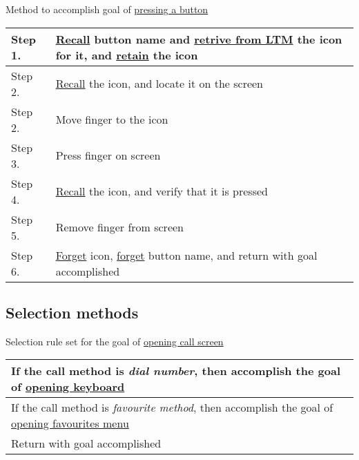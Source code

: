\documentclass{article}
\begin{document}
Method to accomplish goal of \uline{pressing a button}

\begin{tabulary}{\textwidth}{| L | L |}
	\hline
	Step 1. & \uline{Recall} button name and \uline{retrive from LTM} the icon for it, and \uline{retain} the icon \\\hline
	Step 2. & \uline{Recall} the icon, and locate it on the screen \\\hline
	Step 2. & Move finger to the icon \\\hline
	Step 3. & Press finger on screen \\\hline
	Step 4. & \uline{Recall} the icon, and verify that it is pressed \\\hline
	Step 5. & Remove finger from screen \\\hline
	Step 6. & \uline{Forget} icon, \uline{forget} button name, and return with goal accomplished \\\hline
\end{tabulary}

\subsection*{Selection methods}

Selection rule set for the goal of \uline{opening call screen}

\begin{tabulary}{\textwidth}{| L |}
	\hline
	If the call method is \textit{dial number}, then accomplish the goal of \uline{opening keyboard} \\\hline
	If the call method is \textit{favourite method}, then accomplish the goal of \uline{opening favourites menu} \\\hline
	Return with goal accomplished \\\hline
\end{tabulary}

\section{}
\end{document}
